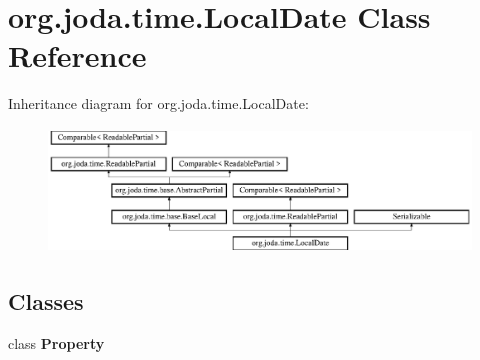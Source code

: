 \hypertarget{classorg_1_1joda_1_1time_1_1_local_date}{\section{org.\-joda.\-time.\-Local\-Date Class Reference}
\label{classorg_1_1joda_1_1time_1_1_local_date}
}
Inheritance diagram for org.\-joda.\-time.\-Local\-Date\-:\begin{figure}[H]
\begin{center}
\leavevmode
\includegraphics[height=3.317535cm]{classorg_1_1joda_1_1time_1_1_local_date}
\end{center}
\end{figure}
\subsection*{Classes}
\begin{DoxyCompactItemize}
\item 
class {\bfseries Property}
\end{DoxyCompactItemize}
